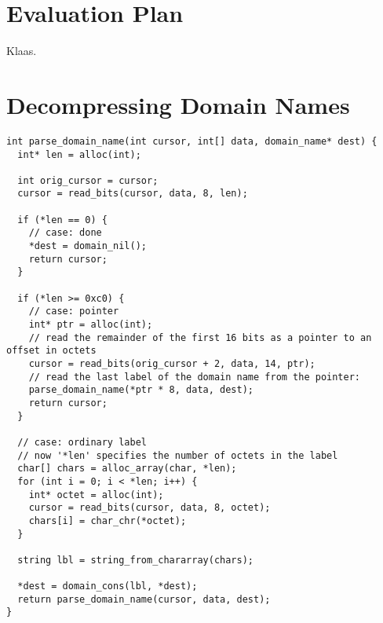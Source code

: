 \documentclass{article}
\begin{document}
\section{Evaluation Plan}

Klaas.


\nocite{willsey-prabhu-pfenning:2016, biagioni-harper-lee-milnes:1994, biagioni-harper-lee:2001, rfc:1034, rfc:1035}



\clearpage
\appendix
\section{Decompressing Domain Names}\label{appendix:decompression}

\begin{lstlisting}
int parse_domain_name(int cursor, int[] data, domain_name* dest) {
  int* len = alloc(int);

  int orig_cursor = cursor;
  cursor = read_bits(cursor, data, 8, len);

  if (*len == 0) {
    // case: done
    *dest = domain_nil();
    return cursor;
  }

  if (*len >= 0xc0) {
    // case: pointer
    int* ptr = alloc(int);
    // read the remainder of the first 16 bits as a pointer to an offset in octets
    cursor = read_bits(orig_cursor + 2, data, 14, ptr);
    // read the last label of the domain name from the pointer:
    parse_domain_name(*ptr * 8, data, dest);
    return cursor;
  }

  // case: ordinary label
  // now '*len' specifies the number of octets in the label
  char[] chars = alloc_array(char, *len);
  for (int i = 0; i < *len; i++) {
    int* octet = alloc(int);
    cursor = read_bits(cursor, data, 8, octet);
    chars[i] = char_chr(*octet);
  }

  string lbl = string_from_chararray(chars);

  *dest = domain_cons(lbl, *dest);
  return parse_domain_name(cursor, data, dest);
}
\end{lstlisting}
\end{document}
